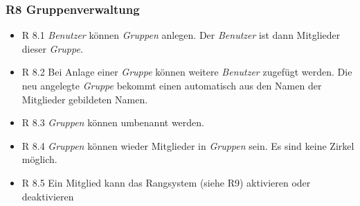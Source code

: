 \documentclass{article}
\begin{document}
\subsubsection{R8 Gruppenverwaltung}
    \begin{itemize}
        \item{R 8.1} \textit{Benutzer} können \textit{Gruppen} anlegen. Der \textit{Benutzer} ist dann Mitglieder dieser \textit{Gruppe}.
        \item{R 8.2} Bei Anlage einer \textit{Gruppe} können weitere \textit{Benutzer} zugefügt werden. Die neu angelegte \textit{Gruppe} bekommt einen automatisch aus den Namen der Mitglieder gebildeten Namen. 
        \item{R 8.3} \textit{Gruppen} können umbenannt werden. 
        \item{R 8.4} \textit{Gruppen} können wieder Mitglieder in \textit{Gruppen} sein. Es sind keine Zirkel möglich. 
        \item{R 8.5} Ein Mitglied kann das Rangsystem (siehe R9) aktivieren oder deaktivieren
    \end{itemize}
    

       
\end{document}

